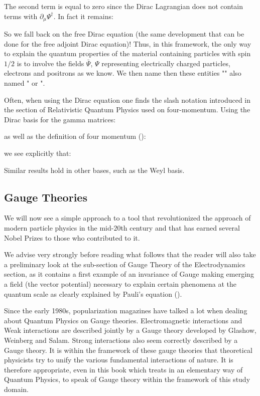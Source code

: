 	The second term is equal to zero since the Dirac Lagrangian does not contain terms with $\partial_\mu\Psi^\dagger$. In fact it remains:
	
	So we fall back on the free Dirac equation (the same development that can be done for the free adjoint Dirac equation)! Thus, in this framework, the only way to explain the quantum properties of the material containing particles with spin $1/2$ is to involve the fields $\bar{\Psi}$, $\Psi$ representing electrically charged particles, electrons and positrons as we know. We then name then these entities "" also named " or ".

	\begin{tcolorbox}[title=Remark,colframe=black,arc=10pt]
	Often, when using the Dirac equation one finds the slash notation introduced in the section of Relativistic Quantum Physics used on four-momentum. Using the Dirac basis for the gamma matrices:
	
	as well as the definition of four momentum ():
	
	we see explicitly that:
	
	Similar results hold in other bases, such as the Weyl basis.
	\end{tcolorbox}
	
	\subsection{Gauge Theories}
	We will now see a simple approach to a tool that revolutionized the approach of modern particle physics in the mid-$20$th century and that has earned several Nobel Prizes to those who contributed to it.

	We advise very strongly before reading what follows that the reader will also take a preliminary look at the sub-section of Gauge Theory of the Electrodynamics section, as it contains a first example of an invariance of Gauge making emerging a field (the vector potential) necessary to explain certain phenomena at the quantum scale as clearly explained by Pauli's equation ().

	Since the early 1980s, popularization magazines have talked a lot when dealing about Quantum Physics on Gauge theories. Electromagnetic interactions and Weak interactions are described jointly by a Gauge theory developed by Glashow, Weinberg and Salam. Strong interactions also seem correctly described by a Gauge theory. It is within the framework of these gauge theories that theoretical physicists try to unify the various fundamental interactions of nature. It is therefore appropriate, even in this book which treats in an elementary way of Quantum Physics, to speak of Gauge theory within the framework of this study domain.
	
